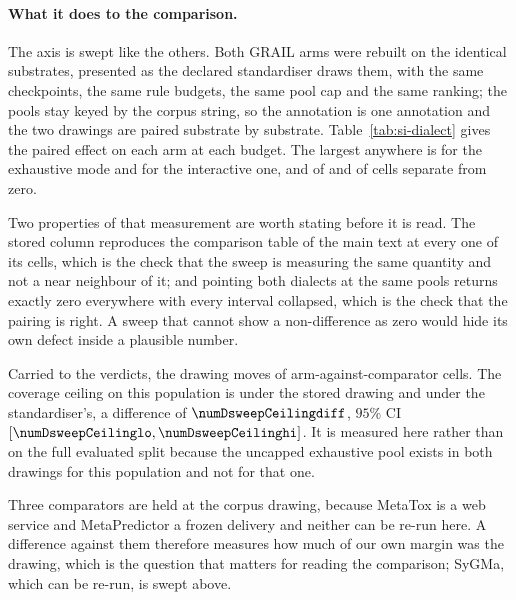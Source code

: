 \paragraph{What it does to the comparison.} The axis is swept like the others. Both GRAIL arms
were rebuilt on the identical substrates, presented as the declared standardiser draws them, with
the same checkpoints, the same rule budgets, the same pool cap and the same ranking; the pools stay
keyed by the corpus string, so the annotation is one annotation and the two drawings are paired
substrate by substrate. Table~\ref{tab:si-dialect} gives the paired effect on each arm at each
budget. The largest anywhere is \numDsweepExhLargest{} for the exhaustive mode and
\numDsweepInterLargest{} for the interactive one, and \numDsweepExhSeparating{} of
\numDsweepExhBudgets{} and \numDsweepInterSeparating{} of \numDsweepInterBudgets{} cells separate
from zero.

Two properties of that measurement are worth stating before it is read. The stored column
reproduces the comparison table of the main text at every one of its cells, which is the check
that the sweep is measuring the same quantity and not a near neighbour of it; and pointing both
dialects at the same pools returns exactly zero everywhere with every interval collapsed, which is
the check that the pairing is right. A sweep that cannot show a non-difference as zero would hide
its own defect inside a plausible number.

Carried to the verdicts, the drawing moves \numDsweepMoved{} of \numDsweepCells{}
arm-against-comparator cells. The coverage ceiling on this population is \numDsweepCeilingstored{}
under the stored drawing and \numDsweepCeilingdrawn{} under the standardiser's, a difference of
$\numDsweepCeilingdiff$, $95\%$ CI $[\numDsweepCeilinglo, \numDsweepCeilinghi]$. It is measured
here rather than on the full evaluated split because the uncapped exhaustive pool exists in both
drawings for this population and not for that one.

Three comparators are held at the corpus drawing, because MetaTox is a web service and
MetaPredictor a frozen delivery and neither can be re-run here. A difference against them
therefore measures how much of our own margin was the drawing, which is the question that matters
for reading the comparison; SyGMa, which can be re-run, is swept above.
